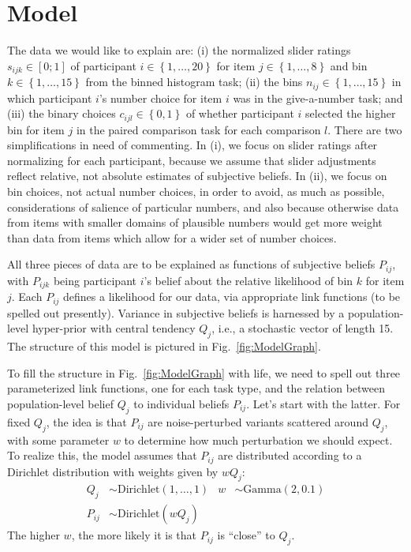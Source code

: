 \documentclass[10pt,letterpaper]{article}
\newcommand{\set}[1]{\left\{#1\right\}}
\newcommand{\figref}[1]{Fig.~\ref{#1}}
\begin{document}
\section{Model}

The data we would like to explain are: (i) the normalized slider ratings $s_{ijk} \in [0;1]$ of
participant $i \in \set{1, \dots, 20}$ for item $j \in \set{1, \dots, 8}$ and bin
$k \in \set{1, \dots, 15}$ from the binned histogram task; (ii) the bins $n_{ij} \in \set{1, \dots, 15}$ in which participant
$i$'s number choice for item $i$ was in the give-a-number task; and (iii) the binary choices $c_{ijl} \in \set{0,1}$ of
whether participant $i$ selected the higher bin for item $j$ in the paired comparison task for each comparison
$l$. There are two simplifications in need of commenting. In (i), we focus on slider ratings after
normalizing for each participant, because we assume that slider adjustments reflect relative, not
absolute estimates of subjective beliefs. In (ii), we focus on bin choices, not actual number
choices, in order to avoid, as much as possible, considerations of salience of particular
numbers, and also because otherwise data from items with smaller domains of plausible numbers
would get more weight than data from items which allow for a wider set of number choices.

All three pieces of data are to be explained as functions of subjective beliefs $P_{ij}$, with
$P_{ijk}$ being participant $i$'s belief about the relative likelihood of bin $k$ for item
$j$. Each $P_{ij}$ defines a likelihood for our data, via appropriate link functions (to be
spelled out presently). Variance in subjective beliefs is harnessed by a population-level
hyper-prior with central tendency $Q_{j}$, i.e., a stochastic vector of length 15. The
structure of this model is pictured in \figref{fig:ModelGraph}.



To fill the structure in \figref{fig:ModelGraph} with life, we need to spell out three
parameterized link functions, one for each task type, and the relation between population-level
belief $Q_j$ to individual beliefs $P_{ij}$. Let's start with the latter. For fixed $Q_j$, the
idea is that $P_{ij}$ are noise-perturbed variants scattered around $Q_j$, with some parameter
$w$ to determine how much perturbation we should expect. To realize this, the model assumes
that $P_{ij}$ are distributed according to a Dirichlet distribution with weights given by
$w Q_{j}$:
\begin{align*}
  Q_j & \sim \text{Dirichlet}(1, \dots, 1) & w & \sim \text{Gamma}(2,0.1) \\
  P_{ij} & \sim \text{Dirichlet}( w Q_j)
\end{align*}
The higher $w$, the more likely it is that $P_{ij}$ is ``close'' to $Q_j$.
\end{document}

